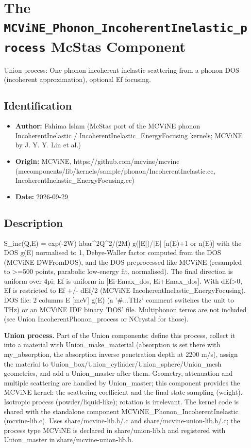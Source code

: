 \section{The \texttt{MCViNE\_Phonon\_IncoherentInelastic\_process} McStas Component}
Union process: One-phonon incoherent inelastic scattering from a phonon DOS (incoherent approximation), optional Ef focusing.

\subsection*{Identification}
\begin{itemize}
  \item \textbf{Author:} Fahima Islam (McStas port of the MCViNE phonon IncoherentInelastic / IncoherentInelastic\_EnergyFocusing kernels; MCViNE by J. Y. Y. Lin et al.)
  \item \textbf{Origin:} MCViNE, https://github.com/mcvine/mcvine (mccomponents/lib/kernels/sample/phonon/IncoherentInelastic.cc, IncoherentInelastic\_EnergyFocusing.cc)
  \item \textbf{Date:} 2026-09-29
\end{itemize}

\subsection*{Description}
S\_inc(Q,E) = exp(-2W) hbar\textasciicircum{}2Q\textasciicircum{}2/(2M) g(|E|)/|E| [n(E)+1 or n(E)] with the DOS g(E) normalised to 1, Debye-Waller factor computed from the DOS (MCViNE DWFromDOS), and the DOS preprocessed like MCViNE (resampled to \textgreater{}=500 points, parabolic low-energy fit, normalised). The final direction is uniform over 4pi; Ef is uniform in [Ei-Emax\_dos, Ei+Emax\_dos]. With dEf\textgreater{}0, Ef is restricted to Ef +/- dEf/2 (MCViNE IncoherentInelastic\_EnergyFocusing). DOS file: 2 columns E [meV] g(E) (a '\#...THz' comment switches the unit to THz) or an MCViNE IDF binary 'DOS' file. Multiphonon terms are not included (see Union IncoherentPhonon\_process or NCrystal for those).

\textbf{Union process.} Part of the Union components: define this process, collect it into a material with Union\_make\_material (absorption is set there with my\_absorption, the absorption inverse penetration depth at 2200 m/s), assign the material to Union\_box/Union\_cylinder/Union\_sphere/Union\_mesh geometries, and add a Union\_master after them. Geometry, attenuation and multiple scattering are handled by Union\_master; this component provides the MCViNE kernel: the scattering coefficient and the final-state sampling (weight). Isotropic process (powder/liquid-like); rotation is irrelevant. The kernel code is shared with the standalone component MCViNE\_Phonon\_IncoherentInelastic (mcvine-lib.c). Uses share/mcvine-lib.h/.c and share/mcvine-union-lib.h/.c; the process type MCViNE is declared in share/union-lib.h and registered with Union\_master in share/mcvine-union-lib.h.

